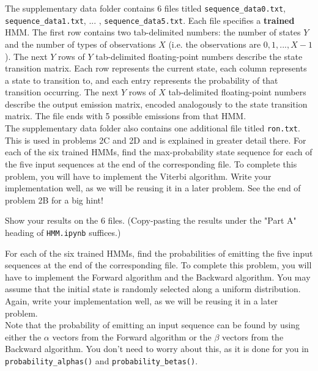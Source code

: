 The supplementary data folder contains 6 files titled \texttt{sequence_data0.txt}, \texttt{sequence_data1.txt}, ... , \texttt{sequence_data5.txt}. Each file specifies a \textbf{trained} HMM. The first row contains two tab-delimited numbers: the number of states $Y$ and the number of types of observations $X$ (i.e. the observations are $0, 1, . . . , X - 1$). The next $Y$ rows of $Y$ tab-delimited floating-point numbers describe the state transition matrix. Each row represents the current state, each column represents a state to transition to, and each entry represents the probability of that transition occurring. The next $Y$ rows of $X$ tab-delimited floating-point numbers describe the output emission matrix, encoded analogously to the state transition matrix. The file ends with 5 possible emissions from that HMM. \\

The supplementary data folder also contains one additional file titled \texttt{ron.txt}. This is used in problems 2C and 2D and is explained in greater detail there. 
\indent\problem[10] %
For each of the six trained HMMs, find the max-probability state sequence for each of the five input sequences at the end of the corresponding file. To complete this problem, you will have to implement the Viterbi algorithm. Write your implementation well, as we will be reusing it in a later problem. See the end of problem 2B for a big hint!

Show your results on the 6 files. (Copy-pasting the results under the "Part A" heading of \texttt{HMM.ipynb} suffices.)
\begin{subsolution}
	
\end{subsolution}
\newpage

\indent\problem[17] %
For each of the six trained HMMs, find the probabilities of emitting the five input sequences at the end of the corresponding file. To complete this problem, you will have to implement the Forward algorithm and the Backward algorithm. You may assume that the initial state is randomly selected along a uniform distribution. Again, write your implementation well, as we will be reusing it in a later problem. \\

Note that the probability of emitting an input sequence can be found by using either the $\alpha$ vectors from the Forward algorithm or the $\beta$ vectors from the Backward algorithm. You don't need to worry about this, as it is done for you in \texttt{probability\_alphas()} and \texttt{probability\_betas()}.

